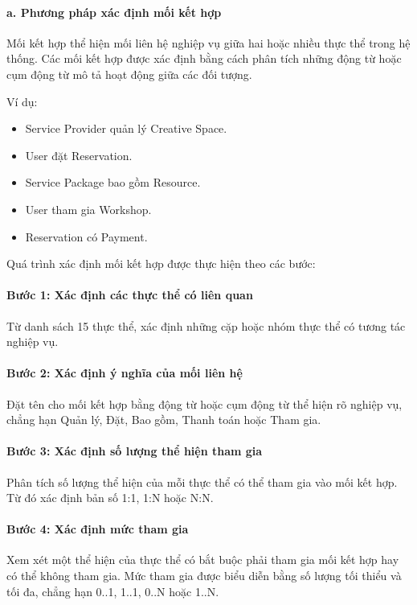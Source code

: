 \paragraph{a. Phương pháp xác định mối kết hợp}\mbox{}\par

Mối kết hợp thể hiện mối liên hệ nghiệp vụ giữa hai hoặc nhiều thực thể trong hệ thống. Các mối kết hợp được xác định bằng cách phân tích những động từ hoặc cụm động từ mô tả hoạt động giữa các đối tượng.

Ví dụ:

\begin{itemize}
\item Service Provider quản lý Creative Space.
\item User đặt Reservation.
\item Service Package bao gồm Resource.
\item User tham gia Workshop.
\item Reservation có Payment.

\end{itemize}
Quá trình xác định mối kết hợp được thực hiện theo các bước:

\paragraph{Bước 1: Xác định các thực thể có liên quan}\mbox{}\par
Từ danh sách 15 thực thể, xác định những cặp hoặc nhóm thực thể có tương tác nghiệp vụ.

\paragraph{Bước 2: Xác định ý nghĩa của mối liên hệ}\mbox{}\par
Đặt tên cho mối kết hợp bằng động từ hoặc cụm động từ thể hiện rõ nghiệp vụ, chẳng hạn Quản lý, Đặt, Bao gồm, Thanh toán hoặc Tham gia.

\paragraph{Bước 3: Xác định số lượng thể hiện tham gia}\mbox{}\par
Phân tích số lượng thể hiện của mỗi thực thể có thể tham gia vào mối kết hợp. Từ đó xác định bản số 1:1, 1:N hoặc N:N.

\paragraph{Bước 4: Xác định mức tham gia}\mbox{}\par
Xem xét một thể hiện của thực thể có bắt buộc phải tham gia mối kết hợp hay có thể không tham gia. Mức tham gia được biểu diễn bằng số lượng tối thiểu và tối đa, chẳng hạn 0..1, 1..1, 0..N hoặc 1..N.


